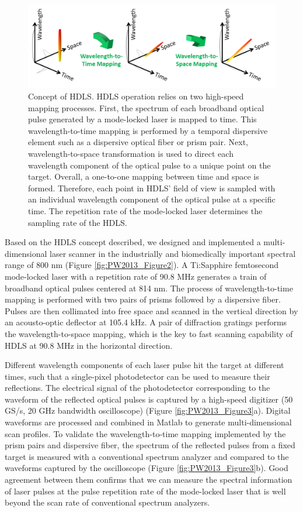 \begin{figure}[htb!]
\centering
\includegraphics[scale=0.65]{PW2013/Figure1.png}
\caption{Concept of HDLS. HDLS operation relies on two high-speed mapping processes. First, the spectrum of each broadband optical pulse generated by a mode-locked laser is mapped to time. This wavelength-to-time mapping is performed by a temporal dispersive element such as a dispersive optical fiber or prism pair. Next, wavelength-to-space transformation is used to direct each wavelength component of the optical pulse to a unique point on the target. Overall, a one-to-one mapping between time and space is formed. Therefore, each point in HDLS’ field of view is sampled with an individual wavelength component of the optical pulse at a specific time. The repetition rate of the mode-locked laser determines the sampling rate of the HDLS.}
\label{fig:PW2013_Figure1}
\end{figure}

Based on the HDLS concept described, we designed and implemented a multi-dimensional laser scanner in the industrially and biomedically important spectral range of 800 nm (Figure \ref{fig:PW2013_Figure2}). A Ti:Sapphire femtosecond mode-locked laser with a repetition rate of 90.8 MHz generates a train of broadband optical pulses centered at 814 nm. The process of wavelength-to-time mapping is performed with two pairs of prisms followed by a dispersive fiber. Pulses are then collimated into free space and scanned in the vertical direction by an acousto-optic deflector at 105.4 kHz. A pair of diffraction gratings performs the wavelength-to-space mapping, which is the key to fast scanning capability of HDLS at 90.8 MHz in the horizontal direction. 

Different wavelength components of each laser pulse hit the target at different times, such that a single-pixel photodetector can be used to measure their reflections. The electrical signal of the photodetector corresponding to the waveform of the reflected optical pulses is captured by a high-speed digitizer (50 GS/s, 20 GHz bandwidth oscilloscope) (Figure \ref{fig:PW2013_Figure3}a). Digital waveforms are processed and combined in Matlab to generate multi-dimensional scan profiles. To validate the wavelength-to-time mapping implemented by the prism pairs and dispersive fiber, the spectrum of the reflected pulses from a fixed target is measured with a conventional spectrum analyzer and compared to the waveforms captured by the oscilloscope (Figure \ref{fig:PW2013_Figure3}b). Good agreement between them confirms that we can measure the spectral information of laser pulses at the pulse repetition rate of the mode-locked laser that is well beyond the scan rate of conventional spectrum analyzers.

